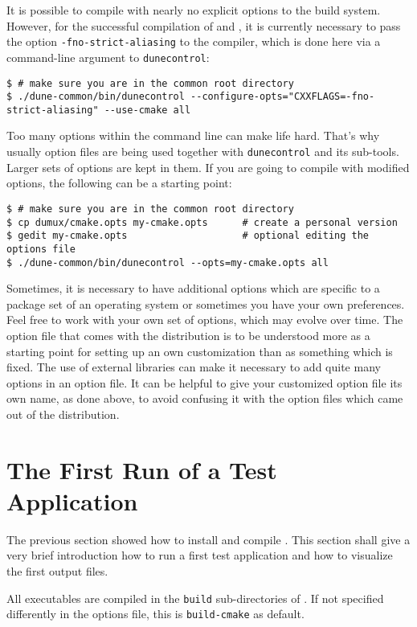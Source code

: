 It is possible to compile \Dumux with nearly no explicit options to the build system.
However, for the successful compilation of \Dune and \Dumux, it is currently necessary to pass
the option \texttt{-fno-strict-aliasing} to the \Cplusplus compiler,
which is done here via a command-line argument to \texttt{dunecontrol}:
\begin{lstlisting}[style=Bash]
$ # make sure you are in the common root directory
$ ./dune-common/bin/dunecontrol --configure-opts="CXXFLAGS=-fno-strict-aliasing" --use-cmake all
\end{lstlisting}

Too many options within the command line can make life hard. That's why usually option files are being used together with \texttt{dunecontrol} and its sub-tools.
Larger sets of options are kept in them. If you are going to compile with modified options, the following
can be a starting point:
\begin{lstlisting}[style=Bash]
$ # make sure you are in the common root directory
$ cp dumux/cmake.opts my-cmake.opts      # create a personal version
$ gedit my-cmake.opts                    # optional editing the options file
$ ./dune-common/bin/dunecontrol --opts=my-cmake.opts all
\end{lstlisting}

Sometimes, it is necessary to have additional options which
are specific to a package set of an operating system or
sometimes you have your own preferences.
Feel free to work with your own set of options, which may evolve over time.
The option file that comes with the distribution is to be understood more as a starting point
for setting up an own customization than as something which is fixed.
The use of external libraries can make it necessary to add quite many options in an option file.
It can be helpful to give your customized option file its own name, as done above,
to avoid confusing it with the option files which came out of the distribution.

\section{The First Run of a Test Application}
\label{quick-start-guide}
The previous section showed how to install and compile \Dumux. This section
shall give a very brief introduction how to run a first test application and how
to visualize the first output files.\par
All executables are compiled in the \texttt{build} sub-directories of \Dumux.
If not specified differently in the options file, this is \texttt{build-cmake} as default.

